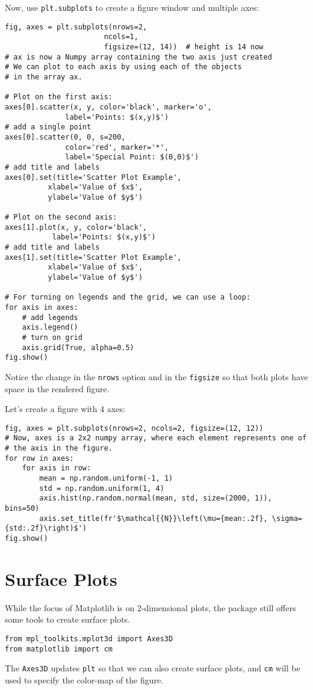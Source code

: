 \documentclass[12pt, a4paper]{article}
\begin{document}
Now, use \texttt{plt.subplots} to create a figure window and multiple axes:
\lstset{language=jupyter-python,label= ,caption= ,captionpos=b,numbers=none}
\begin{lstlisting}
fig, axes = plt.subplots(nrows=2,
                       ncols=1,
                       figsize=(12, 14))  # height is 14 now
# ax is now a Numpy array containing the two axis just created
# We can plot to each axis by using each of the objects
# in the array ax.

# Plot on the first axis:
axes[0].scatter(x, y, color='black', marker='o',
              label='Points: $(x,y)$')
# add a single point
axes[0].scatter(0, 0, s=200,
              color='red', marker='*',
              label='Special Point: $(0,0)$')
# add title and labels
axes[0].set(title='Scatter Plot Example',
          xlabel='Value of $x$',
          ylabel='Value of $y$')

# Plot on the second axis:
axes[1].plot(x, y, color='black',
           label='Points: $(x,y)$')
# add title and labels
axes[1].set(title='Scatter Plot Example',
          xlabel='Value of $x$',
          ylabel='Value of $y$')

# For turning on legends and the grid, we can use a loop:
for axis in axes:
    # add legends
    axis.legend()
    # turn on grid
    axis.grid(True, alpha=0.5)
fig.show()
\end{lstlisting}
Notice the change in the \texttt{nrows} option and in the \texttt{figsize} so that both plots have space in the rendered figure.

Let's create a figure with 4 axes:
\lstset{language=jupyter-python,label= ,caption= ,captionpos=b,numbers=none}
\begin{lstlisting}
fig, axes = plt.subplots(nrows=2, ncols=2, figsize=(12, 12))
# Now, axes is a 2x2 numpy array, where each element represents one of
# the axis in the figure.
for row in axes:
    for axis in row:
        mean = np.random.uniform(-1, 1)
        std = np.random.uniform(1, 4)
        axis.hist(np.random.normal(mean, std, size=(2000, 1)), bins=50)
        axis.set_title(fr'$\mathcal{{N}}\left(\mu={mean:.2f}, \sigma={std:.2f}\right)$')
fig.show()
\end{lstlisting}
\section{Surface Plots}
\label{sec:org3271894}
While the focus of Matplotlib is on 2-dimensional plots, the package still offers some tools to create surface plots.
\lstset{language=jupyter-python,label= ,caption= ,captionpos=b,numbers=none}
\begin{lstlisting}
from mpl_toolkits.mplot3d import Axes3D
from matplotlib import cm
\end{lstlisting}
The \texttt{Axes3D} updates \texttt{plt} so that we can also create surface plots, and \texttt{cm} will be used to specify the color-map of the figure.
\end{document}
